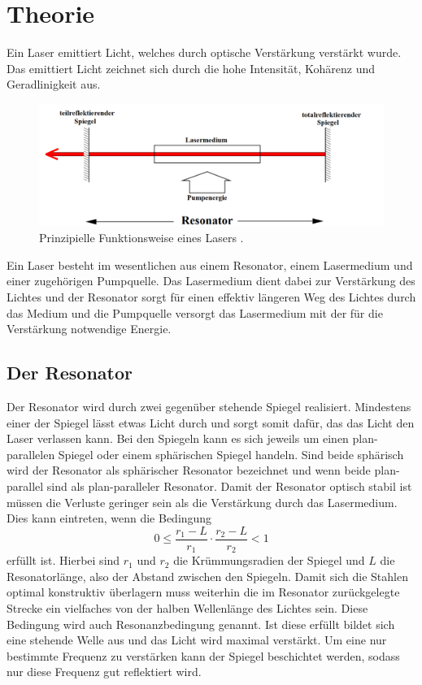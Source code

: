 
\section{Theorie}
\label{sec:Theorie}

Ein Laser emittiert Licht, welches durch optische Verstärkung verstärkt wurde. Das emittiert Licht zeichnet sich durch die hohe Intensität, Kohärenz und Geradlinigkeit aus.

\begin{figure}
	\centering
	\includegraphics[width=\linewidth-100pt,height=\textheight-100pt,keepaspectratio]{content/Images/schema.png}
	\caption{Prinzipielle Funktionsweise eines Lasers \cite{V61}.}
\end{figure}
Ein Laser besteht im wesentlichen aus einem Resonator, einem Lasermedium und einer zugehörigen Pumpquelle. Das Lasermedium dient dabei zur Verstärkung des Lichtes und der Resonator sorgt für einen effektiv längeren Weg des Lichtes durch das Medium und die Pumpquelle versorgt das Lasermedium mit der für die Verstärkung notwendige Energie. 

\subsection{Der Resonator}
Der Resonator wird durch zwei gegenüber stehende Spiegel realisiert. Mindestens einer der Spiegel lässt etwas Licht durch und sorgt somit dafür, das das Licht den Laser verlassen kann. Bei den Spiegeln kann es sich jeweils um einen plan-parallelen Spiegel oder einem sphärischen Spiegel handeln. Sind beide sphärisch wird der Resonator als sphärischer Resonator bezeichnet und wenn beide plan-parallel sind als plan-paralleler Resonator. Damit der Resonator optisch stabil ist müssen die Verluste geringer sein als die Verstärkung durch das Lasermedium. Dies kann eintreten, wenn die Bedingung
\begin{equation}
	0 \leq \frac{r_1 -L}{r_1} \cdot \frac{r_2 -L}{r_2} < 1 \label{eq:stabil}
\end{equation}
erfüllt ist. Hierbei sind $r_1$ und $r_2$ die Krümmungsradien der Spiegel und $L$ die Resonatorlänge, also der Abstand zwischen den Spiegeln. Damit sich die Stahlen optimal konstruktiv überlagern muss weiterhin die im Resonator zurückgelegte Strecke ein vielfaches von der halben Wellenlänge des Lichtes sein. Diese Bedingung wird auch Resonanzbedingung genannt. Ist diese erfüllt bildet sich eine stehende Welle aus und das Licht wird maximal verstärkt. Um eine nur bestimmte Frequenz zu verstärken kann der Spiegel beschichtet werden, sodass nur diese Frequenz gut reflektiert wird.


